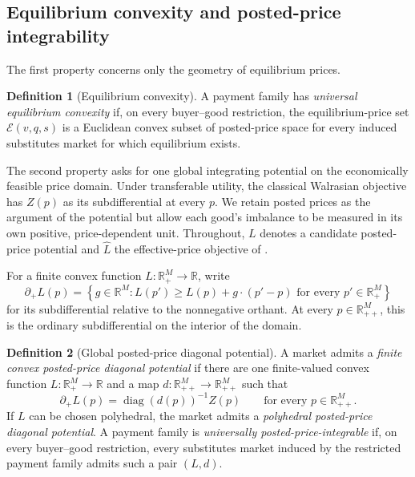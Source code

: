 \documentclass[11pt,a4paper,fleqn]{article}
\theoremstyle{plain}
\theoremstyle{definition}
\newtheorem{definition}{Definition}
\newcommand{\R}{\mathbb{R}}
\newcommand{\diag}{\operatorname{diag}}
\newcommand{\Ecal}{\mathcal{E}}
\begin{document}
\subsection{Equilibrium convexity and posted-price integrability}\label{subsec:two-notions}

The first property concerns only the geometry of equilibrium prices.

\begin{definition}[Equilibrium convexity]\label{def:eq-convexity}
A payment family has \emph{universal equilibrium convexity} if, on every buyer--good restriction, the equilibrium-price set $\Ecal(v,q,s)$ is a Euclidean convex subset of posted-price space for every induced substitutes market for which equilibrium exists.
\end{definition}

The second property asks for one global integrating potential on the economically feasible price domain. Under transferable utility, the classical Walrasian objective has $Z(p)$ as its subdifferential at every $p$. We retain posted prices as the argument of the potential but allow each good's imbalance to be measured in its own positive, price-dependent unit. Throughout, $L$ denotes a candidate posted-price potential and $\widehat L$ the effective-price objective of .

For a finite convex function $L:\R_+^M\to\R$, write
\[
\partial_+L(p)=
\left\{g\in\R^M:
L(p')\ge L(p)+g\cdot(p'-p)
\text{ for every }p'\in\R_+^M
\right\}
\]
for its subdifferential relative to the nonnegative orthant. At every $p\in\R_{++}^M$, this is the ordinary subdifferential on the interior of the domain.

\begin{definition}[Global posted-price diagonal potential]\label{def:potential}
A market admits a \emph{finite convex posted-price diagonal potential} if there are one finite-valued convex function $L:\R_+^M\to\R$ and a map $d:\R_{++}^M\to\R_{++}^M$ such that
\begin{equation}\label{eq:potential-definition}
\partial_+L(p)=\diag(d(p))^{-1}Z(p)
\qquad\text{for every }p\in\R_{++}^M.
\end{equation}
If $L$ can be chosen polyhedral, the market admits a \emph{polyhedral posted-price diagonal potential}. A payment family is \emph{universally posted-price-integrable} if, on every buyer--good restriction, every substitutes market induced by the restricted payment family admits such a pair $(L,d)$.
\end{definition}
\end{document}
